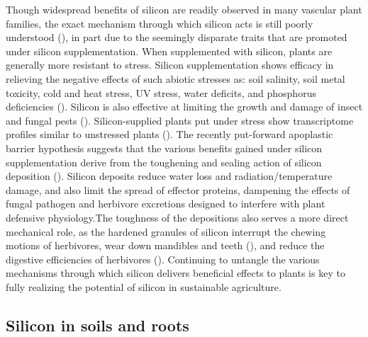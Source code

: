 \documentclass[12pt, letterpaper, ]{article}
\begin{document}
Though widespread benefits of silicon are readily observed in many vascular plant families, the exact mechanism through which silicon acts is still poorly understood (\cite{coskun_controversies_2019}), in part due to the seemingly disparate traits that are promoted under silicon supplementation. When supplemented with silicon, plants are generally more resistant to stress. Silicon supplementation shows efficacy in relieving the negative effects of such abiotic stresses as: soil salinity, soil metal toxicity, cold and heat stress, UV stress, water deficits, and phosphorus deficiencies (\cite{cooke_consistent_2016}). Silicon is also effective at limiting the growth and damage of insect and fungal pests (\cite{fauteux_silicon_2005,massey_herbivore_2007}). Silicon-supplied plants put under stress show transcriptome profiles similar to unstressed plants (\cite{coskun_controversies_2019}). The recently put-forward apoplastic barrier hypothesis suggests that the various benefits gained under silicon supplementation derive from the toughening and sealing action of silicon deposition (\cite{coskun_controversies_2019}). Silicon deposits reduce water loss and radiation/temperature damage, and also limit the spread of effector proteins, dampening the effects of fungal pathogen and herbivore excretions designed to interfere with plant defensive physiology.The toughness of the depositions also serves a more direct mechanical role, as the hardened granules of silicon interrupt the chewing motions of herbivores, wear down mandibles and teeth (\cite{stromberg_functions_2016,waterman_short-term_2021-1}), and reduce the digestive efficiencies of herbivores (\cite{johnson_silicon_2021}). Continuing to untangle the various mechanisms through which silicon delivers beneficial effects to plants is key to fully realizing the potential of silicon in sustainable agriculture. 

\subsection{Silicon in soils and roots}
\end{document}

